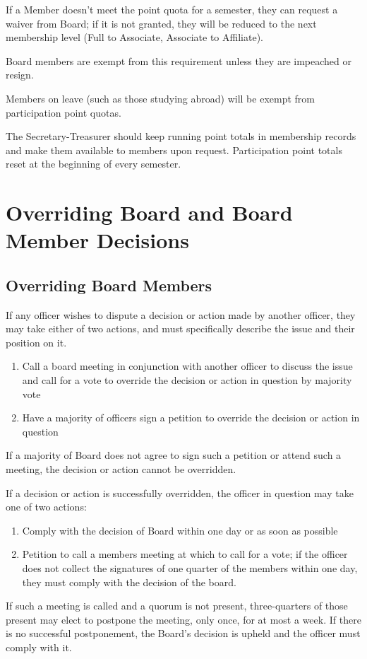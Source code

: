 \documentclass[12pt]{amsart}
\begin{document}
If a Member doesn't meet the point quota for a semester, they can request a waiver from Board; if it is not granted, they will be reduced to the next membership level (Full to Associate, Associate to Affiliate).

Board members are exempt from this requirement unless they are impeached or resign.

Members on leave (such as those studying abroad) will be exempt from participation point quotas.

The Secretary-Treasurer should keep running point totals in membership records and make them available to members upon request. Participation point totals reset at the beginning of every semester.

\section {Overriding Board and Board Member Decisions}
\subsection{Overriding Board Members}
If any officer wishes to dispute a decision or action made by another officer, they may take either of two actions, and must specifically describe the issue and their position on it.
\begin{enumerate}
	\item Call a board meeting in conjunction with another officer to discuss the issue and call for a vote to override the decision or action in question by majority vote
	\item Have a majority of officers sign a petition to override the decision or action in question
\end{enumerate}
If a majority of Board does not agree to sign such a petition or attend such a meeting, the decision or action cannot be overridden.

If a decision or action is successfully overridden, the officer in question may take one of two actions:
\begin{enumerate}
	\item Comply with the decision of Board within one day or as soon as possible
	\item Petition to call a members meeting at which to call for a vote; if the officer does not collect the signatures of one quarter of the members within one day, they must comply with the decision of the board.
\end{enumerate}
If such a meeting is called and a quorum is not present, three-quarters of those present may elect to postpone the meeting, only once, for at most a week. If there is no successful postponement, the Board's decision is upheld and the officer must comply with it.
\end{document}
